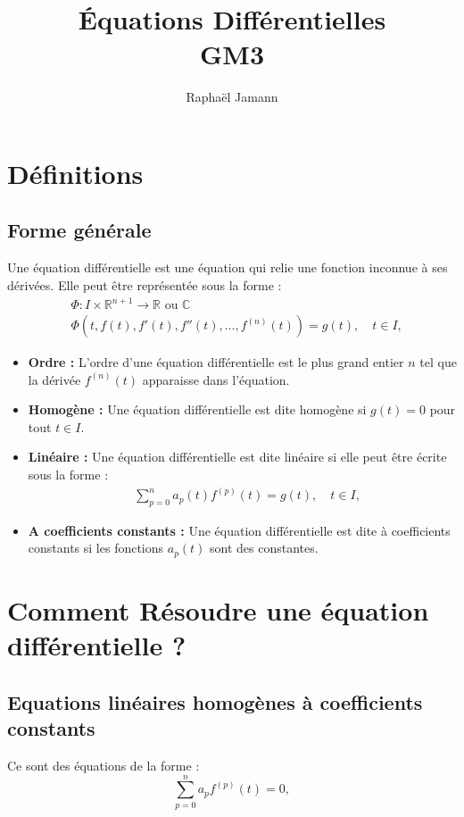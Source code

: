 \documentclass[a4paper,11pt]{article}
\title{Équations Différentielles\\GM3}
\author{Raphaël Jamann}
\date{}
\begin{document}
    \maketitle

    \section{Définitions}

        \subsection*{Forme générale}
        Une équation différentielle est une équation qui relie une fonction inconnue à ses dérivées. Elle peut être représentée sous la forme :
        \begin{align*}
            &\Phi : I \times \mathbb{R}^{n+1} \to \mathbb{R} \text{ ou } \mathbb{C} \\
            &\Phi(t, f(t), f'(t), f''(t), \ldots, f^{(n)}(t)) = g(t), \quad t \in I,
        \end{align*}

        \begin{itemize}
            \item \textbf{Ordre :} L'ordre d'une équation différentielle est le plus grand entier $n$ tel que la dérivée $f^{(n)}(t)$ apparaisse dans l'équation.
            \item \textbf{Homogène :} Une équation différentielle est dite homogène si $g(t) = 0$ pour tout $t \in I$.
            \item \textbf{Linéaire :} Une équation différentielle est dite linéaire si elle peut être écrite sous la forme :
            \begin{align}
                &\sum_{p=0}^{n} a_p(t) f^{(p)}(t) = g(t), \quad t \in I,
            \end{align}
            \item \textbf{A coefficients constants :} Une équation différentielle est dite à coefficients constants si les fonctions $a_p(t)$ sont des constantes.
        \end{itemize}

    \section{Comment Résoudre une équation différentielle ?}
        
        \subsection*{Equations linéaires homogènes à coefficients constants}
        Ce sont des équations de la forme :
            \begin{equation}
                \sum_{p=0}^{n} a_p f^{(p)}(t) = 0,
            \end{equation}
\end{document}
